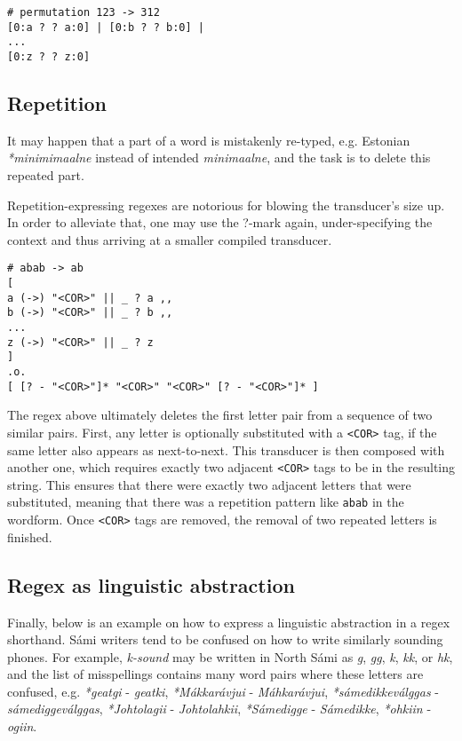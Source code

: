\documentclass{flammie}
\begin{document}
\begin{lstlisting}
# permutation 123 -> 312
[0:a ? ? a:0] | [0:b ? ? b:0] |
...
[0:z ? ? z:0]
\end{lstlisting}

\subsection{Repetition}

It may happen that a part of a word is mistakenly re-typed, e.g. Estonian
\textit{*minimimaalne} instead of intended \textit{minimaalne}, and the task is
to delete this repeated part.

Repetition-expressing regexes are notorious for blowing the transducer's size
up. In order to alleviate that, one may use the ?-mark again, under-specifying
the context and thus arriving at a smaller compiled transducer.

\begin{lstlisting}
# abab -> ab
[
a (->) "<COR>" || _ ? a ,,
b (->) "<COR>" || _ ? b ,,
...
z (->) "<COR>" || _ ? z
]
.o.
[ [? - "<COR>"]* "<COR>" "<COR>" [? - "<COR>"]* ]
\end{lstlisting}

The regex above ultimately deletes the first letter pair from a sequence of two
similar pairs. First, any letter is optionally substituted with a \texttt{<COR>}
tag, if the same letter also appears as next-to-next. This transducer is then
composed with another one, which requires exactly two adjacent \texttt{<COR>}
tags to be in the resulting string. This ensures that there were exactly two
adjacent letters that were substituted, meaning that there was a repetition
pattern like \texttt{abab} in the wordform. Once \texttt{<COR>} tags are
removed, the removal of two repeated letters is finished.

\subsection{Regex as linguistic abstraction}

Finally, below is an example on how to express a linguistic abstraction in a
regex shorthand.  Sámi writers tend to be confused on how to write similarly
sounding phones. For example, \textit{k-sound} may be written in North Sámi as
\textit{g}, \textit{gg}, \textit{k}, \textit{kk}, or \textit{hk}, and the list
of misspellings contains many word pairs where these letters are confused, e.g.
\textit{*geatgi} - \textit{geatki}, \textit{*Mákkarávjui} -
\textit{Máhkarávjui}, \textit{*sámedikkeválggas} - \textit{sámediggeválggas},
\textit{*Johtolagii} - \textit{Johtolahkii}, \textit{*Sámedigge} -
\textit{Sámedikke}, \textit{*ohkiin} - \textit{ogiin}.
\end{document}
